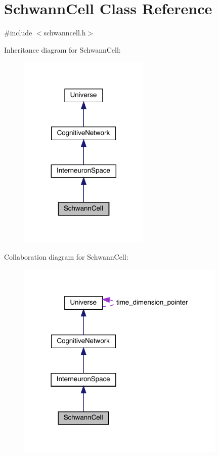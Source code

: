 \hypertarget{class_schwann_cell}{}\section{Schwann\+Cell Class Reference}
\label{class_schwann_cell}


{\ttfamily \#include $<$schwanncell.\+h$>$}



Inheritance diagram for Schwann\+Cell\+:\nopagebreak
\begin{figure}[H]
\begin{center}
\leavevmode
\includegraphics[width=176pt]{class_schwann_cell__inherit__graph}
\end{center}
\end{figure}


Collaboration diagram for Schwann\+Cell\+:\nopagebreak
\begin{figure}[H]
\begin{center}
\leavevmode
\includegraphics[width=283pt]{class_schwann_cell__coll__graph}
\end{center}
\end{figure}
